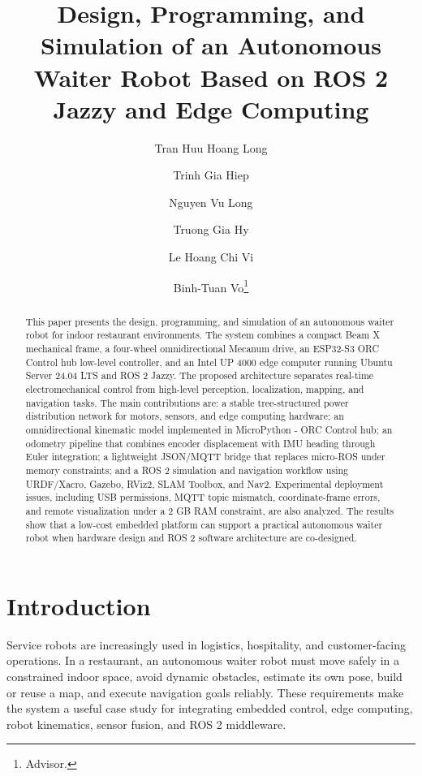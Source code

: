 \documentclass{llncs}
\begin{document}
\title{Design, Programming, and Simulation of an Autonomous Waiter Robot Based on ROS 2 Jazzy and Edge Computing}
\author{Tran Huu Hoang Long\and
Trinh Gia Hiep \and
Nguyen Vu Long \and
Truong Gia Hy \and
Le Hoang Chi Vi \and
Binh-Tuan Vo\thanks{Advisor.}}

\maketitle

\begin{abstract}
This paper presents the design, programming, and simulation of an autonomous waiter robot for indoor restaurant environments. The system combines a compact Beam X mechanical frame, a four-wheel omnidirectional Mecanum drive, an ESP32-S3 ORC Control hub low-level controller, and an Intel UP 4000 edge computer running Ubuntu Server 24.04 LTS and ROS 2 Jazzy. The proposed architecture separates real-time electromechanical control from high-level perception, localization, mapping, and navigation tasks. The main contributions are: a stable tree-structured power distribution network for motors, sensors, and edge computing hardware; an omnidirectional kinematic model implemented in MicroPython - ORC Control hub; an odometry pipeline that combines encoder displacement with IMU heading through Euler integration; a lightweight JSON/MQTT bridge that replaces micro-ROS under memory constraints; and a ROS 2 simulation and navigation workflow using URDF/Xacro, Gazebo, RViz2, SLAM Toolbox, and Nav2. Experimental deployment issues, including USB permissions, MQTT topic mismatch, coordinate-frame errors, and remote visualization under a 2 GB RAM constraint, are also analyzed. The results show that a low-cost embedded platform can support a practical autonomous waiter robot when hardware design and ROS 2 software architecture are co-designed.

\end{abstract}

\section{Introduction}
Service robots are increasingly used in logistics, hospitality, and customer-facing operations. In a restaurant, an autonomous waiter robot must move safely in a constrained indoor space, avoid dynamic obstacles, estimate its own pose, build or reuse a map, and execute navigation goals reliably. These requirements make the system a useful case study for integrating embedded control, edge computing, robot kinematics, sensor fusion, and ROS 2 middleware.
\end{document}
